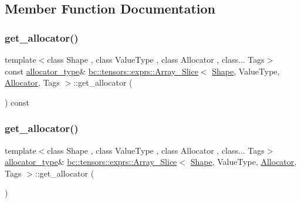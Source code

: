 \subsection{Member Function Documentation}
\mbox{\label{classbc_1_1tensors_1_1exprs_1_1Array__Slice_ab520f10a439cba864b29a6a230533e91}} 
\subsubsection{\texorpdfstring{get\+\_\+allocator()}{get\_allocator()}\hspace{0.1cm}{\footnotesize\ttfamily [1/2]}}
{\footnotesize\ttfamily template$<$class Shape , class Value\+Type , class Allocator , class... Tags$>$ \\
const \hyperlink{classbc_1_1tensors_1_1exprs_1_1Array__Slice_a54761123998b091676d1b0deef26d376}{allocator\+\_\+type}\& \hyperlink{classbc_1_1tensors_1_1exprs_1_1Array__Slice}{bc\+::tensors\+::exprs\+::\+Array\+\_\+\+Slice}$<$ \hyperlink{structbc_1_1Shape}{Shape}, Value\+Type, \hyperlink{classbc_1_1allocators_1_1Allocator}{Allocator}, Tags $>$\+::get\+\_\+allocator (\begin{DoxyParamCaption}{ }\end{DoxyParamCaption}) const\hspace{0.3cm}{\ttfamily [inline]}}

\mbox{\label{classbc_1_1tensors_1_1exprs_1_1Array__Slice_ac933425cbd4d31a5a717603af289fe70}} 
\subsubsection{\texorpdfstring{get\+\_\+allocator()}{get\_allocator()}\hspace{0.1cm}{\footnotesize\ttfamily [2/2]}}
{\footnotesize\ttfamily template$<$class Shape , class Value\+Type , class Allocator , class... Tags$>$ \\
\hyperlink{classbc_1_1tensors_1_1exprs_1_1Array__Slice_a54761123998b091676d1b0deef26d376}{allocator\+\_\+type}\& \hyperlink{classbc_1_1tensors_1_1exprs_1_1Array__Slice}{bc\+::tensors\+::exprs\+::\+Array\+\_\+\+Slice}$<$ \hyperlink{structbc_1_1Shape}{Shape}, Value\+Type, \hyperlink{classbc_1_1allocators_1_1Allocator}{Allocator}, Tags $>$\+::get\+\_\+allocator (\begin{DoxyParamCaption}{ }\end{DoxyParamCaption})\hspace{0.3cm}{\ttfamily [inline]}}

